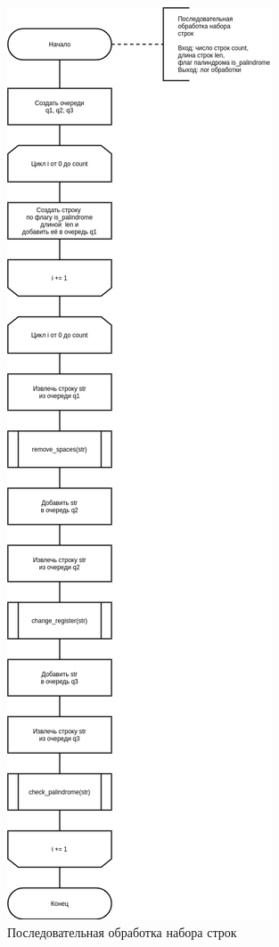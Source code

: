 \begin{figure}[H]
	\begin{center}
		\includegraphics[scale=0.4]{img/linear.png}
	\end{center}
	\captionsetup{justification=centering}
	\caption{Последовательная обработка набора строк}
	\label{img:linear}
\end{figure}

